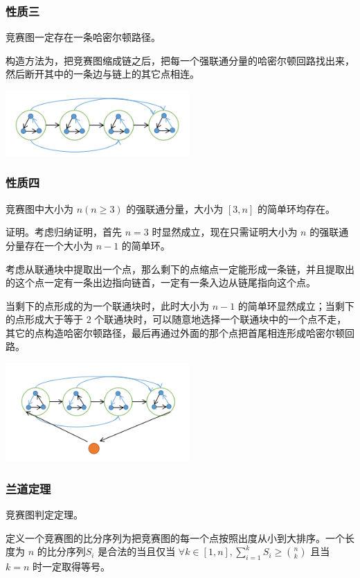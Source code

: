 \documentclass[UTF-8]{ctexart}
\begin{document}
				\subsubsection{性质三}
				竞赛图一定存在一条哈密尔顿路径。
				
				构造方法为，把竞赛图缩成链之后，把每一个强联通分量的哈密尔顿回路找出来，然后断开其中的一条边与链上的其它点相连。
				\begin{center}
					\includegraphics[width=7cm]{file//hamiltonian2.png}
				\end{center}
				\subsubsection{性质四}
				竞赛图中大小为 $n(n\ge3)$ 的强联通分量，大小为 $[3,n]$ 的简单环均存在。
				
				证明。考虑归纳证明，首先 $n=3$ 时显然成立，现在只需证明大小为 $n$ 的强联通分量存在一个大小为 $n-1$ 的简单环。
				
				考虑从联通块中提取出一个点，那么剩下的点缩点一定能形成一条链，并且提取出的这个点一定有一条出边指向链首，一定有一条入边从链尾指向这个点。
				
				当剩下的点形成的为一个联通块时，此时大小为 $n-1$ 的简单环显然成立；当剩下的点形成大于等于 $2$ 个联通块时，可以随意地选择一个联通块中的一个点不走，其它的点构造哈密尔顿路径，最后再通过外面的那个点把首尾相连形成哈密尔顿回路。
				\begin{center}
					\includegraphics[width=7cm]{file//hamiltonian3.png}
				\end{center}
				\subsubsection{兰道定理}
				竞赛图判定定理。
				
				定义一个竞赛图的比分序列为把竞赛图的每一个点按照出度从小到大排序。一个长度为 $n$ 的比分序列$S_i$ 是合法的当且仅当 $\forall k\in[1,n],\sum_{i=1}^kS_i\ge\binom{n}{k}$ 且当 $k=n$ 时一定取得等号。
\end{document}
